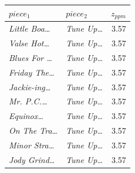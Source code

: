 \begin{tabular}{llr}
\toprule
$piece_1$ & $piece_2$ & $z_{ppm}$ \\
\midrule
\textit{Little Boa\dots} & \textit{Tune Up\dots} & 3.57 \\
\textit{Valse Hot\dots} & \textit{Tune Up\dots} & 3.57 \\
\textit{Blues For \dots} & \textit{Tune Up\dots} & 3.57 \\
\textit{Friday The\dots} & \textit{Tune Up\dots} & 3.57 \\
\textit{Jackie-ing\dots} & \textit{Tune Up\dots} & 3.57 \\
\textit{Mr. P.C.\dots} & \textit{Tune Up\dots} & 3.57 \\
\textit{Equinox\dots} & \textit{Tune Up\dots} & 3.57 \\
\textit{On The Tra\dots} & \textit{Tune Up\dots} & 3.57 \\
\textit{Minor Stra\dots} & \textit{Tune Up\dots} & 3.57 \\
\textit{Jody Grind\dots} & \textit{Tune Up\dots} & 3.57 \\
\bottomrule
\end{tabular}
